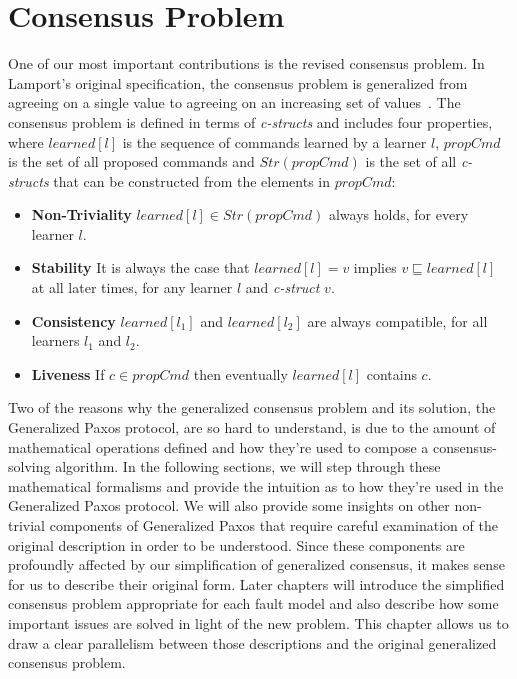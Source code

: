 \chapter{Consensus Problem} \label{problem}

One of our most important contributions is the revised consensus problem. In Lamport's original specification, the consensus problem is generalized from agreeing on a single value to agreeing on an increasing set of values~\cite{Lamport2005}. The consensus problem is defined in terms of \textit{c-structs} and includes four properties, where $learned[l]$ is the sequence of commands learned by a learner $l$, $propCmd$ is the set of all proposed commands and $Str(propCmd)$ is the set of all \textit{c-structs} that can be constructed from the elements in $propCmd$:
\begin{itemize}
	\item \textbf{Non-Triviality} $learned[l] \in Str(propCmd)$ always holds, for every learner $l$.
	\item \textbf{Stability} It is always the case that $learned[l] = v$ implies $v \sqsubseteq learned[l]$ at all later times, for any learner $l$ and \textit{c-struct} $v$.
	\item \textbf{Consistency} $learned[l_1]$ and $learned[l_2]$ are always compatible, for all learners $l_1$ and $l_2$.
	\item \textbf{Liveness} If $c \in propCmd$ then eventually $learned[l]$ contains $c$.
\end{itemize}

\par
Two of the reasons why the generalized consensus problem and its solution, the Generalized Paxos protocol, are so hard to understand, is due to the amount of mathematical operations defined and how they're used to compose a consensus-solving algorithm. In the following sections, we will step through these mathematical formalisms and provide the intuition as to how they're used in the Generalized Paxos protocol. We will also provide some insights on other non-trivial components of Generalized Paxos that require careful examination of the original description in order to be understood. Since these components are profoundly affected by our simplification of generalized consensus, it makes sense for us to describe their original form. Later chapters will introduce the simplified consensus problem appropriate for each fault model and also describe how some important issues are solved in light of the new problem. This chapter allows us to draw a clear parallelism between those descriptions and the original generalized consensus problem.

